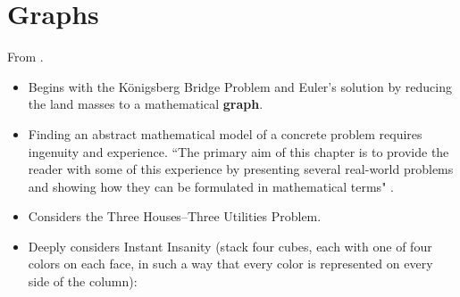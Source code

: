 \documentclass[titlepage]{article}
\numberwithin{figure}{section}
\newcommand{\dq}[4][]{``#2"#1 \cite[#4]{#3}.}
\begin{document}
\section{Graphs}
From \cite{bib:graph}.
\begin{itemize}
    \item Begins with the K\"{o}nigsberg Bridge Problem and Euler's solution by reducing the land masses to a mathematical \textbf{graph}.
    \item Finding an abstract mathematical model of a concrete problem requires ingenuity and experience. \dq{The primary aim of this chapter is to provide the reader with some of this experience by presenting several real-world problems and showing how they can be formulated in mathematical terms}{bib:graph}{277-78}
    \item Considers the Three Houses--Three Utilities Problem.
    \item Deeply considers Instant Insanity (stack four cubes, each with one of four colors on each face, in such a way that every color is represented on every side of the column):
    \begin{figure}[h!]
        \centering
\end{figure}
\end{itemize}
\end{document}

